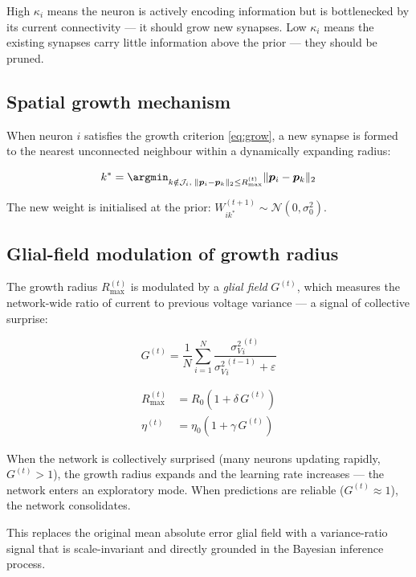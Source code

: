 \documentclass[12pt, a4paper]{article}
\newcommand{\Normal}{\mathcal{N}}
\newcommand{\sV}{\sigma^{2}_{V}}
\begin{document}
High $\kappa_i$ means the neuron is actively encoding information but is bottlenecked
by its current connectivity --- it should grow new synapses. Low $\kappa_i$ means the
existing synapses carry little information above the prior --- they should be pruned.

\subsection{Spatial growth mechanism}

When neuron $i$ satisfies the growth criterion \eqref{eq:grow}, a new synapse is formed
to the nearest unconnected neighbour within a dynamically expanding radius:

\begin{equation}
    k^* = \argmin_{k \notin \mathcal{J}_i,\; \|\bm{p}_i - \bm{p}_k\|_2 \leq R_{\max}^{(t)}}
    \|\bm{p}_i - \bm{p}_k\|_2
    \label{eq:growth_target}
\end{equation}

The new weight is initialised at the prior: $W_{ik^*}^{(t+1)} \sim \Normal(0, \sigma^2_0)$.

\subsection{Glial-field modulation of growth radius}

The growth radius $R_{\max}^{(t)}$ is modulated by a \emph{glial field} $G^{(t)}$,
which measures the network-wide ratio of current to previous voltage variance --- a
signal of collective surprise:

\begin{equation}
    G^{(t)} = \frac{1}{N}\sum_{i=1}^N
    \frac{\sV_i^{(t)}}{\sV_i^{(t-1)} + \varepsilon}
    \label{eq:glial}
\end{equation}

\begin{align}
    R_{\max}^{(t)} &= R_0\left(1 + \delta\, G^{(t)}\right) \label{eq:rmax} \\[4pt]
    \eta^{(t)}     &= \eta_0\left(1 + \gamma\, G^{(t)}\right) \label{eq:eta}
\end{align}

When the network is collectively surprised (many neurons updating rapidly, $G^{(t)} > 1$),
the growth radius expands and the learning rate increases --- the network enters an
exploratory mode. When predictions are reliable ($G^{(t)} \approx 1$), the network
consolidates.

This replaces the original mean absolute error glial field with a variance-ratio signal
that is scale-invariant and directly grounded in the Bayesian inference process.
\end{document}
